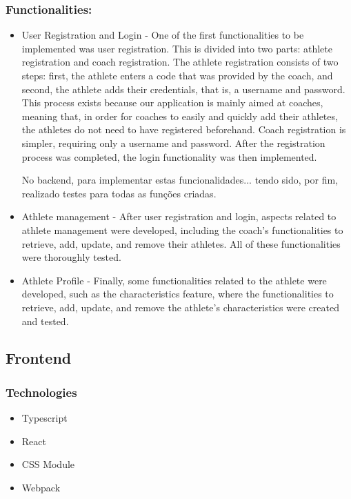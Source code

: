 \documentclass[a4paper,twoside,11pt]{article}
\begin{document}
\subsubsection{Functionalities:}
\begin{itemize}
\item User Registration and Login - 
One of the first functionalities to be implemented was user registration. This is divided into two parts: athlete registration and coach registration. The athlete registration consists of two steps: first, the athlete enters a code that was provided by the coach, and second, the athlete adds their credentials, that is, a username and password. This process exists because our application is mainly aimed at coaches, meaning that, in order for coaches to easily and quickly add their athletes, the athletes do not need to have registered beforehand. Coach registration is simpler, requiring only a username and password. After the registration process was completed, the login functionality was then implemented.

No backend, para implementar estas funcionalidades... tendo sido, por fim, realizado testes para todas as funções criadas.

\item Athlete management - 
After user registration and login, aspects related to athlete management were developed, including the coach's functionalities to retrieve, add, update, and remove their athletes. All of these functionalities were thoroughly tested.

\item Athlete Profile - 
Finally, some functionalities related to the athlete were developed, such as the characteristics feature, where the functionalities to retrieve, add, update, and remove the athlete's characteristics were created and tested.

\end{itemize}

\subsection{Frontend}

\subsubsection{Technologies}
\begin{itemize}
\item Typescript
\item React
\item CSS Module
\item Webpack
\end{itemize}
\end{document}
